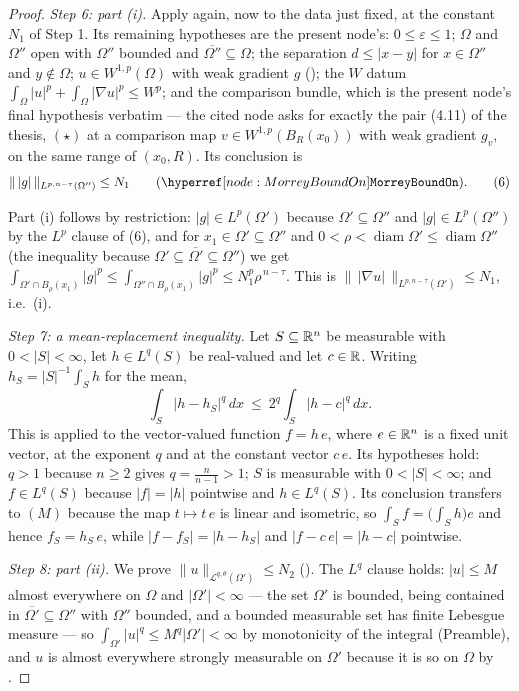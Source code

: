 \begin{proof}
\emph{Step 6: part (i).}  Apply  again, now to
the data just fixed, at the constant $N_1$ of Step 1.  Its remaining hypotheses
are the present node's: $0\le\varepsilon\le1$; $\Omega$ and $\Omega''$ open
with $\Omega''$ bounded and $\overline{\Omega''}\subseteq\Omega$; the
separation $d\le|x-y|$ for $x\in\Omega''$ and $y\notin\Omega$;
$u\in W^{1,p}(\Omega)$ with weak gradient $g$ (); the
$W$ datum $\int_\Omega|u|^p+\int_\Omega|\nabla u|^p\le W^p$; and the comparison
bundle, which is the present node's final hypothesis verbatim --- the cited
node asks for exactly the pair (4.11) of the thesis, $(\star)$ at a comparison map
$v\in W^{1,p}(B_R(x_0))$ with weak gradient $g_v$, on the same range of
$(x_0,R)$.  Its conclusion is
\[
\|\,|g|\,\|_{L^{p,n-\tau}(\Omega'')}\le N_1
\qquad(\noderef{MorreyBoundOn}).
\tag{6}
\]

Part (i) follows by restriction: $|g|\in L^p(\Omega')$ because $\Omega'\subseteq\Omega''$
and $|g|\in L^p(\Omega'')$ by the $L^p$ clause of (6), and for
$x_1\in\Omega'\subseteq\Omega''$ and
$0<\rho<\operatorname{diam}\Omega'\le\operatorname{diam}\Omega''$
(the inequality because $\Omega'\subseteq\overline{\Omega'}\subseteq\Omega''$)
we get
$\int_{\Omega'\cap B_\rho(x_1)}|g|^p\le
\int_{\Omega''\cap B_\rho(x_1)}|g|^p\le N_1^p\rho^{\,n-\tau}$.
This is $\|\,|\nabla u|\,\|_{L^{p,n-\tau}(\Omega')}\le N_1$, i.e.\ (i).

\emph{Step 7: a mean-replacement inequality.}  Let $S\subseteq\mathbb{R}^n$ be
measurable with $0<|S|<\infty$, let $h\in L^q(S)$ be real-valued and let
$c\in\mathbb{R}$.  Writing $h_S=|S|^{-1}\int_Sh$ for the mean,
\[
\int_S|h-h_S|^q\,dx\ \le\ 2^q\int_S|h-c|^q\,dx .
\tag{M}
\]
This is  applied to the vector-valued function
$f=h\,e$, where $e\in\mathbb{R}^n$ is a fixed unit vector, at the exponent $q$ and at
the constant vector $c\,e$.  Its hypotheses hold: $q>1$ because $n\ge2$ gives
$q=\frac n{n-1}>1$; $S$ is measurable with $0<|S|<\infty$; and $f\in L^q(S)$
because $|f|=|h|$ pointwise and $h\in L^q(S)$.  Its conclusion transfers to
$(M)$ because the map $t\mapsto t\,e$ is linear and isometric, so
$\int_Sf=\bigl(\int_Sh\bigr)e$ and hence $f_S=h_S\,e$, while
$|f-f_S|=|h-h_S|$ and $|f-c\,e|=|h-c|$ pointwise.

\emph{Step 8: part (ii).}  We prove
$\|u\|_{\mathcal L^{q,\theta}(\Omega')}\le N_2$ ().
The $L^q$ clause holds: $|u|\le M$ almost everywhere on $\Omega$ and
$|\Omega'|<\infty$ --- the set $\Omega'$ is bounded, being contained in
$\overline{\Omega'}\subseteq\Omega''$ with $\Omega''$ bounded, and a bounded
measurable set has finite Lebesgue measure --- so
$\int_{\Omega'}|u|^q\le M^q|\Omega'|<\infty$ by monotonicity of the integral
(Preamble), and $u$ is almost everywhere strongly measurable on $\Omega'$
because it is so on $\Omega$ by .


\end{proof}
